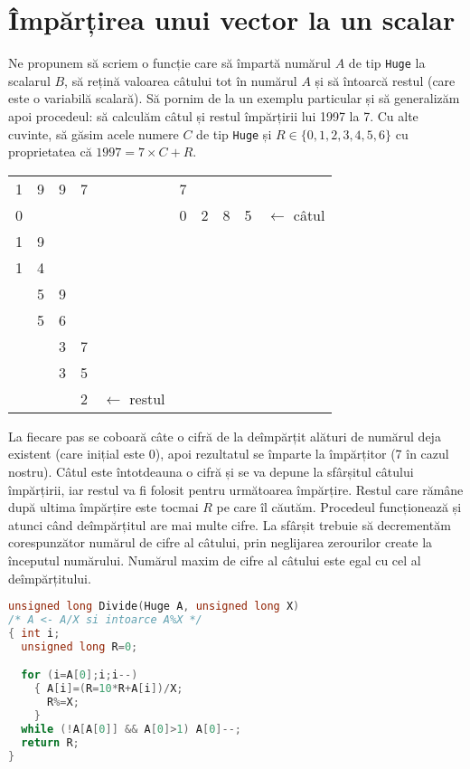 \section{Împărțirea unui vector la un scalar}

Ne propunem să scriem o funcție care să împartă numărul $A$ de tip {\tt Huge}
la scalarul $B$, să rețină valoarea câtului tot în numărul $A$ și să întoarcă
restul (care este o variabilă scalară). Să pornim de la un exemplu particular
și să generalizăm apoi procedeul: să calculăm câtul și restul împărțirii lui
1997 la 7. Cu alte cuvinte, să găsim acele numere $C$ de tip {\tt Huge} și $R
\in \{0, 1, 2, 3, 4, 5, 6\}$ cu proprietatea că $1997 = 7 \times C + R$.

\begin{center}
  \begin{tabular}{
      llll
      llllll}
    1 & 9 & 9 & 7 & & \multicolumn{1}{|l}{7} & & & & \\ \cline{6-9}
    0 & & & & & \multicolumn{1}{|l}{0} & 2 & 8 & 5 & $\leftarrow$ câtul \\ \cline{1-1}
    1 & 9 & & & & & & & & \\
    1 & 4 & & & & & & & & \\ \cline{1-2}
    & 5 & 9 & & & & & & & \\
    & 5 & 6 & & & & & & & \\ \cline{2-3}
    & & 3 & 7 & & & & & & \\
    & & 3 & 5 & & & & & & \\ \cline{3-4}
    & & & 2 & $\leftarrow$ restul & & & & &
  \end{tabular}
\end{center}

La fiecare pas se coboară câte o cifră de la deîmpărțit alături de numărul
deja existent (care inițial este 0), apoi rezultatul se împarte la împărțitor
(7 în cazul nostru). Câtul este întotdeauna o cifră și se va depune la
sfârșitul câtului împărțirii, iar restul va fi folosit pentru următoarea
împărțire. Restul care rămâne după ultima împărțire este tocmai $R$ pe care îl
căutăm. Procedeul funcționează și atunci când deîmpărțitul are mai multe
cifre. La sfârșit trebuie să decrementăm corespunzător numărul de cifre al
câtului, prin neglijarea zerourilor create la începutul numărului. Numărul
maxim de cifre al câtului este egal cu cel al deîmpărțitului.

\begin{lstlisting}[language=C]
unsigned long Divide(Huge A, unsigned long X)
/* A <- A/X si intoarce A%X */
{ int i;
  unsigned long R=0;

  for (i=A[0];i;i--)
    { A[i]=(R=10*R+A[i])/X;
      R%=X;
    }
  while (!A[A[0]] && A[0]>1) A[0]--;
  return R;
}
\end{lstlisting}

